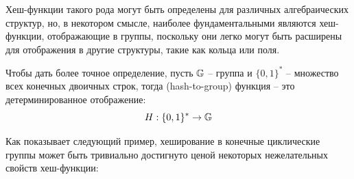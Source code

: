 Хеш-функции такого рода могут быть определены для различных алгебраических структур, но, в некотором смысле, наиболее фундаментальными являются хеш-функции, отображающие в группы, поскольку они легко могут быть расширены для отображения в другие структуры, такие как кольца или поля.

Чтобы дать более точное определение, пусть $\mathbb{G}$ -- группа и $\{0,1\}^*$ -- множество всех конечных двоичных строк, тогда  (hash-to-group) функция -- это детерминированное отображение:
\begin{equation}
H : \{0,1\}^* \to \mathbb{G}
\end{equation}

Как показывает следующий пример, хеширование в конечные циклические группы может быть тривиально достигнуто ценой некоторых нежелательных свойств хеш-функции:

